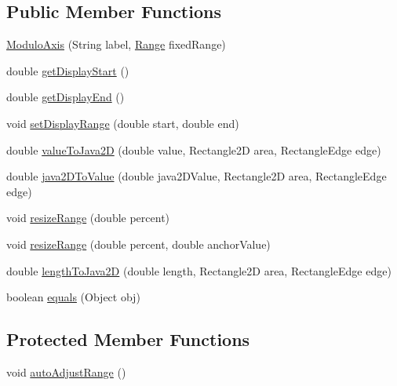 \subsection*{Public Member Functions}
\begin{DoxyCompactItemize}
\item 
\mbox{\hyperlink{classorg_1_1jfree_1_1chart_1_1axis_1_1_modulo_axis_ab9f3b40d9c5db575a736f56a35e999e0}{Modulo\+Axis}} (String label, \mbox{\hyperlink{classorg_1_1jfree_1_1data_1_1_range}{Range}} fixed\+Range)
\item 
double \mbox{\hyperlink{classorg_1_1jfree_1_1chart_1_1axis_1_1_modulo_axis_ad000be9bdbfbd452202c1594b2b70364}{get\+Display\+Start}} ()
\item 
double \mbox{\hyperlink{classorg_1_1jfree_1_1chart_1_1axis_1_1_modulo_axis_af16d9c2b4eecb8d0f64e2155e7d57d91}{get\+Display\+End}} ()
\item 
void \mbox{\hyperlink{classorg_1_1jfree_1_1chart_1_1axis_1_1_modulo_axis_af962bfba0673ec9f40ca70afa99b2567}{set\+Display\+Range}} (double start, double end)
\item 
double \mbox{\hyperlink{classorg_1_1jfree_1_1chart_1_1axis_1_1_modulo_axis_a0c097f38b1301f9f0f247a08f20532f0}{value\+To\+Java2D}} (double value, Rectangle2D area, Rectangle\+Edge edge)
\item 
double \mbox{\hyperlink{classorg_1_1jfree_1_1chart_1_1axis_1_1_modulo_axis_a0881c74867dd37ac58f399bc7c0c1c8e}{java2\+D\+To\+Value}} (double java2\+D\+Value, Rectangle2D area, Rectangle\+Edge edge)
\item 
void \mbox{\hyperlink{classorg_1_1jfree_1_1chart_1_1axis_1_1_modulo_axis_a002bcc528d4243e0fd698d0ab4c6f9bb}{resize\+Range}} (double percent)
\item 
void \mbox{\hyperlink{classorg_1_1jfree_1_1chart_1_1axis_1_1_modulo_axis_add261c68e8ad12b55939a523aef85580}{resize\+Range}} (double percent, double anchor\+Value)
\item 
double \mbox{\hyperlink{classorg_1_1jfree_1_1chart_1_1axis_1_1_modulo_axis_ae8c8eb5be537371c66d32f4c08b7b7c9}{length\+To\+Java2D}} (double length, Rectangle2D area, Rectangle\+Edge edge)
\item 
boolean \mbox{\hyperlink{classorg_1_1jfree_1_1chart_1_1axis_1_1_modulo_axis_a8cbf0b046bffac08a9ceea2ddf60ea50}{equals}} (Object obj)
\end{DoxyCompactItemize}
\subsection*{Protected Member Functions}
\begin{DoxyCompactItemize}
\item 
void \mbox{\hyperlink{classorg_1_1jfree_1_1chart_1_1axis_1_1_modulo_axis_aed1941a255220f1568bd06510d21e01b}{auto\+Adjust\+Range}} ()
\end{DoxyCompactItemize}
